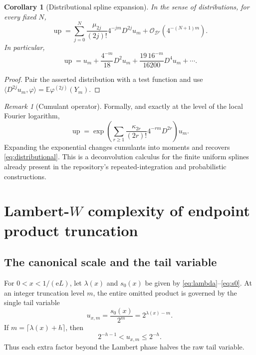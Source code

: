 \documentclass[11pt,oneside]{article}
\numberwithin{equation}{section}
\newtheorem{corollary}[theorem]{Corollary}
\theoremstyle{definition}
\theoremstyle{remark}
\newtheorem{remark}[theorem]{Remark}
\newcommand{\E}{\mathbb E}
\newcommand{\Up}{\operatorname{up}}
\newcommand{\e}{\mathrm e}
\newcommand{\bigO}{\mathcal O}
\begin{document}
\begin{corollary}[Distributional spline expansion]
\label{cor:distributional}
In the sense of distributions, for every fixed $N$,
\begin{equation}
 \Up
 =\sum_{j=0}^{N}\frac{\mu_{2j}}{(2j)!}4^{-jm}D^{2j}u_m
 +\bigO_{\mathcal D'}(4^{-(N+1)m}).
 \label{eq:distributional}
\end{equation}
In particular,
\begin{equation}
 \Up=u_m+\frac{4^{-m}}{18}D^2u_m
 +\frac{19\,16^{-m}}{16200}D^4u_m+\cdots.
 \label{eq:distributional-first}
\end{equation}
\end{corollary}

\begin{proof}
Pair the asserted distribution with a test function and use
$\langle D^{2j}u_m,\varphi\rangle=\E\varphi^{(2j)}(Y_m)$.
\end{proof}

\begin{remark}[Cumulant operator]
Formally, and exactly at the level of the local Fourier logarithm,
\begin{equation}
 \Up=\exp\!\left(\sum_{r\ge1}
 \frac{\kappa_{2r}}{(2r)!}4^{-rm}D^{2r}\right)u_m.
 \label{eq:cumulant-operator}
\end{equation}
Expanding the exponential changes cumulants into moments and recovers
\eqref{eq:distributional}.  This is a deconvolution calculus for the finite uniform splines
already present in the repository's repeated-integration and probabilistic constructions.
\end{remark}

\section{Lambert-$W$ complexity of endpoint product truncation}
\label{sec:Lambert-complexity}

\subsection{The canonical scale and the tail variable}

For $0<x<1/(\e L)$, let $\lambda(x)$ and $s_0(x)$ be given by
\eqref{eq:lambda}--\eqref{eq:s0}.  At an integer truncation level $m$, the entire omitted
product is governed by the single tail variable
\begin{equation}
 u_{x,m}=\frac{s_0(x)}{2^m}=2^{\lambda(x)-m}.
 \label{eq:uxm}
\end{equation}
If $m=\lceil\lambda(x)+h\rceil$, then
\begin{equation}
 2^{-h-1}<u_{x,m}\le2^{-h}.
 \label{eq:u-window}
\end{equation}
Thus each extra factor beyond the Lambert phase halves the raw tail variable.
\end{document}
